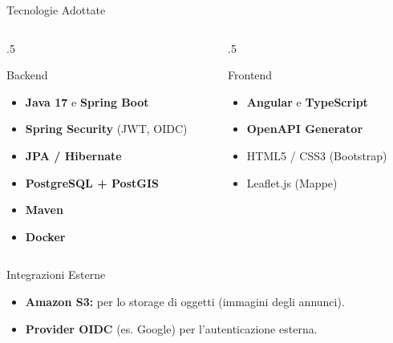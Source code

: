 \documentclass[10pt]{beamer}
\begin{document}
\begin{frame}{Tecnologie Adottate}
    \begin{columns}[T]
        \begin{column}{.5\textwidth}
            \begin{block}{Backend}
                \begin{itemize}
                    \item \textbf{Java 17} e \textbf{Spring Boot}
                    \item \textbf{Spring Security} (JWT, OIDC)
                    \item \textbf{JPA / Hibernate}
                    \item \textbf{PostgreSQL + PostGIS}
                    \item \textbf{Maven}
                    \item \textbf{Docker}
                \end{itemize}
            \end{block}
        \end{column}
        \begin{column}{.5\textwidth}
            \begin{block}{Frontend}
                \begin{itemize}
                    \item \textbf{Angular} e \textbf{TypeScript}
                    \item \textbf{OpenAPI Generator}
                    \item HTML5 / CSS3 (Bootstrap)
                    \item Leaflet.js (Mappe)
                \end{itemize}
            \end{block}
        \end{column}
    \end{columns}
    \begin{block}{Integrazioni Esterne}
        \begin{itemize}
            \item \textbf{Amazon S3:} per lo storage di oggetti (immagini degli annunci).
            \item \textbf{Provider OIDC} (es. Google) per l'autenticazione esterna.
        \end{itemize}
    \end{block}
\end{frame}
\end{document}
